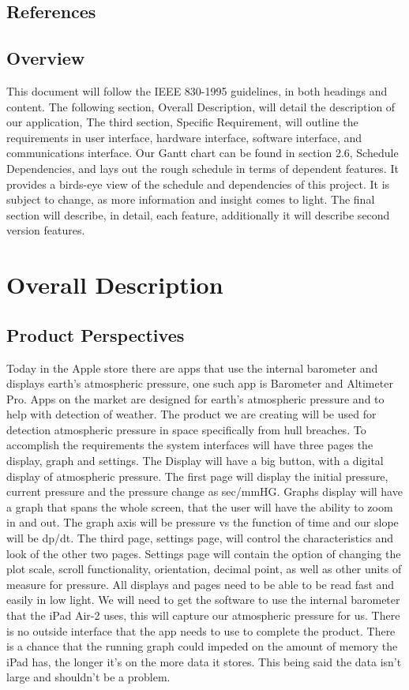 \documentclass[onecolumn, draftclsnofoot,10pt, compsoc]{IEEEtran}
\begin{document}
\subsection{References}

\subsection{Overview}
This document will follow the IEEE 830-1995 guidelines, in both headings and content.
The following section, Overall Description, will detail the description of our application,
The third section, Specific Requirement, will outline the requirements in user interface, hardware interface, software interface, and communications interface.
Our Gantt chart can be found in section 2.6, Schedule Dependencies, and lays out the rough schedule in terms of dependent features.
It provides a birds-eye view of the schedule and dependencies of this project.
It is subject to change, as more information and insight comes to light.
The final section will describe, in detail, each feature, additionally it will describe second version features.


\section{Overall Description}

\subsection{Product Perspectives}
Today in the Apple store there are apps that use the internal barometer and displays earth's atmospheric pressure, one such app is Barometer and Altimeter Pro.
Apps on the market are designed for earth's atmospheric pressure and to help with detection of weather.
The product we are creating will be used for detection atmospheric pressure in space specifically from hull breaches.
To accomplish the requirements the system interfaces will have three pages the display, graph and settings.
The Display will have a big button, with a digital display of atmospheric pressure.
The first page will display the initial pressure, current pressure and the pressure change as sec/mmHG.
Graphs display will have a graph that spans the whole screen, that the user will have the ability to zoom in and out.
 The graph axis will be pressure vs the function of time and our slope will be dp/dt.
 The third page, settings page, will control the characteristics and look of the other two pages.
Settings page will contain the option of changing the plot scale, scroll functionality, orientation, decimal point, as well as other units of measure for pressure.
 All displays and pages need to be able to be read fast and easily in low light.
We will need to get the software to use the internal barometer that the iPad Air-2 uses, this will capture our atmospheric pressure for us.
There is no outside interface that the app needs to use to complete the product.
There is a chance that the running graph could impeded on the amount of memory the iPad has, the longer it's on the more data it stores.
This being said the data isn't large and shouldn't be a problem.
\end{document}
